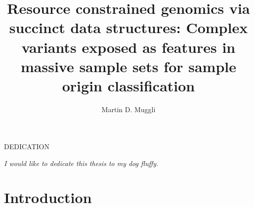 \documentclass[doctor]{thesis}
\title{Resource constrained genomics via succinct data structures: Complex variants exposed as features in massive sample sets for sample origin classification}
\author{Martin D. Muggli}
\begin{document}
 
\frontmatter 
\maketitle              \makemycopyright        \makeabstract           \makeacknowledgements   
{} \begin{flatcenter} 
        DEDICATION

        \vfill 
    \noindent \textit{I would like to dedicate this thesis to my dog fluffy.}
    \vfill \end{flatcenter}
\newpage

\tableofcontents    \listoftables       \listoffigures      
\mainmatter 
\chapter{Introduction}







\end{document}
